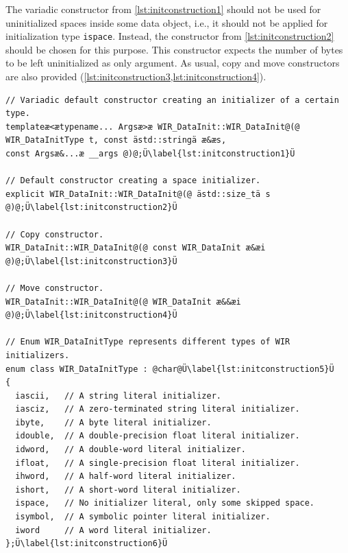 The variadic constructor from \cref{lst:initconstruction1} should not be used for uninitialized spaces inside some data object, i.e., it should not be applied for initialization type \texttt{ispace}.
Instead, the constructor from \cref{lst:initconstruction2} should be chosen for this purpose.
This constructor expects the number of bytes to be left uninitialized as only argument.
As usual, copy and move constructors are also provided (\cref{lst:initconstruction3,lst:initconstruction4}).

\begin{lstlisting}[style=code,float=t,caption={Constructors of Class \texttt{WIR\_DataInit}},label=lst:initconstruction]
// Variadic default constructor creating an initializer of a certain type.
templateæ<ætypename... Argsæ>æ WIR_DataInit::WIR_DataInit@(@ WIR_DataInitType t, const ästd::stringä æ&æs,                                                                 const Argsæ&...æ __args @)@;Ü\label{lst:initconstruction1}Ü

// Default constructor creating a space initializer.
explicit WIR_DataInit::WIR_DataInit@(@ ästd::size_tä s @)@;Ü\label{lst:initconstruction2}Ü

// Copy constructor.
WIR_DataInit::WIR_DataInit@(@ const WIR_DataInit æ&æi @)@;Ü\label{lst:initconstruction3}Ü

// Move constructor.
WIR_DataInit::WIR_DataInit@(@ WIR_DataInit æ&&æi @)@;Ü\label{lst:initconstruction4}Ü

// Enum WIR_DataInitType represents different types of WIR initializers.
enum class WIR_DataInitType : @char@Ü\label{lst:initconstruction5}Ü
{
  iascii,   // A string literal initializer.
  iasciz,   // A zero-terminated string literal initializer.
  ibyte,    // A byte literal initializer.
  idouble,  // A double-precision float literal initializer.
  idword,   // A double-word literal initializer.
  ifloat,   // A single-precision float literal initializer.
  ihword,   // A half-word literal initializer.
  ishort,   // A short-word literal initializer.
  ispace,   // No initializer literal, only some skipped space.
  isymbol,  // A symbolic pointer literal initializer.
  iword     // A word literal initializer.
};Ü\label{lst:initconstruction6}Ü
\end{lstlisting}

